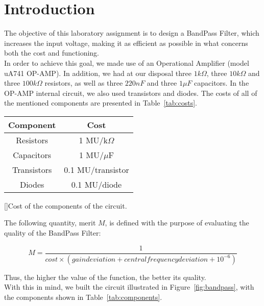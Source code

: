 \section{Introduction}
\label{sec:introduction}

The objective of this laboratory assignment is to design a BandPass Filter, which increases the input voltage, making it as efficient as possible in what concerns both the cost and functioning. \\

In order to achieve this goal, we made use of an Operational Amplifier (model uA741 OP-AMP). In addition, we had at our disposal three $1k\Omega$, three $10k\Omega$ and three $100k\Omega$ resistors, as well as three $220 nF$ and three $1 \mu F$ capacitors. In the OP-AMP internal circuit, we also used transistors and diodes. The costs of all of the mentioned components are presented in Table~\ref{tab:costs}.

\begin{center}
\begin{tabular}{ | c | c | }
\hline
\textbf{Component} & \textbf{Cost} \\
\hline
Resistors & 1 MU/k$\Omega$ \\  
Capacitors & 1 MU/$\mu$F \\
Transistors & 0.1 MU/transistor \\
Diodes & 0.1 MU/diode \\
\hline   
\end{tabular}
[]{Cost of the components of the circuit.}
\label{tab:costs}
\end{center}

The following quantity, merit $M$, is defined with the purpose of evaluating the quality of the BandPass Filter:

\vspace{-2mm}

\begin{equation}
  M = \frac{1}{cost \times (gain deviation + central frequency deviation + 10^{-6})}
\end{equation}

\vspace{2mm}

Thus, the higher the value of the function, the better its quality.\\

With this in mind, we built the circuit illustrated in Figure~\ref{fig:bandpass}, with the components shown in Table~\ref{tab:components}.

